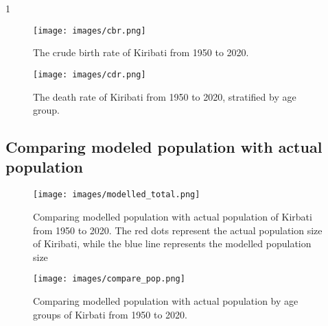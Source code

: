 1
\begin{figure}[!htp]
   \texttt{[image: images/cbr.png]}
    \caption{The crude birth rate of Kiribati from 1950 to 2020.}
    \label{fig:cbr}
\end{figure}

\begin{figure}[!htp]
   \centerline{\texttt{[image: images/cdr.png]}}
    \caption{The death rate of Kiribati from 1950 to 2020, stratified by age group.}
    \label{fig:cdr}
\end{figure}

\subsection{Comparing modeled population with actual population}
\begin{figure}[!htp]
    \centerline{\texttt{[image: images/modelled\_total.png]}}
    \caption{Comparing modelled population with actual population of Kirbati from 1950 to 2020. The red dots represent the actual population size of Kiribati,
     while the blue line represents the modelled population size}
    \label{fig:modelled_total}
\end{figure}

\begin{figure}[!htp]
    \centerline{\texttt{[image: images/compare\_pop.png]}}
    \caption{Comparing modelled population with actual population by age groups of Kirbati from 1950 to 2020.}
    \label{fig:compare_group}
\end{figure}